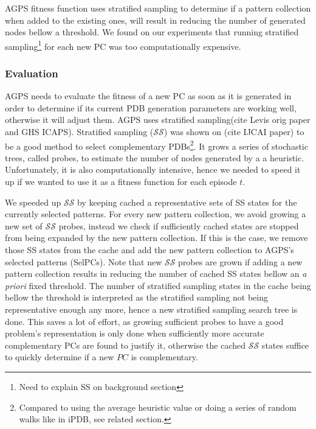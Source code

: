 \documentclass{article}
\newcommand{\mc}{\mathcal}
\begin{document}
AGPS fitness function uses stratified sampling to determine if a pattern collection when added to the existing ones, will result in reducing the number of generated nodes bellow a threshold.  We found on our experiments that running stratified sampling\footnote{Need to explain SS on background section} for each new PC was too computationally expensive.  
\subsubsection{Evaluation}
AGPS needs to evaluate the fitness of a new PC as soon as it is generated in order to determine if its current PDB generation parameters are working well, otherwise it will adjust them. AGPS uses stratified sampling(cite Levis orig paper and GHS ICAPS).  Stratified sampling ($\mc{SS}$) was shown on (cite IJCAI paper) to be a good method to select complementary PDBs\footnote{Compared to using the average heuristic value or doing a series of random walks like in iPDB, see related section.}.  It grows a series of stochastic trees, called probes, to estimate the number of nodes generated by a a heuristic.  Unfortunately, it is also computationally intensive, hence we needed to speed it up if we wanted to use it as a fitness function for each episode $t$. 

We speeded up $\mc{SS}$ by keeping cached a representative sets of SS states for the currently selected patterns.  For every new pattern collection, we avoid growing a new set of $\mc{SS}$ probes, instead we check if sufficiently cached states are stopped from being expanded by the new pattern collection.  If this is the case, we remove those SS states from the cache and add the new pattern collection to AGPS's selected patterns (SelPCs).  Note that new $\mc{SS}$ probes are grown if adding a new pattern collection results in reducing the number of cached SS states bellow an \emph{a priori} fixed threshold.  The number of stratified sampling states in the cache being bellow the threshold is interpreted as the stratified sampling not being representative enough any more, hence a new stratified sampling search tree is done.  This saves a lot of effort, as growing sufficient probes to have a good problem's representation is only done when sufficiently more accurate complementary PCs are found to justify it, otherwise the cached $\mc{SS}$ states suffice to quickly determine if a new $PC$ is complementary.
\end{document}
